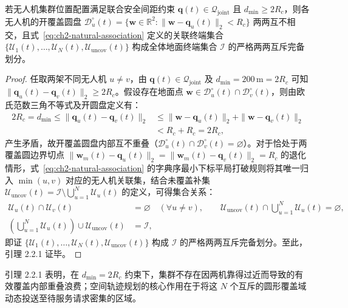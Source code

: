 \begin{lemma}[自然覆盖最近邻关联互斥性与完备划分]
若无人机集群位置配置满足联合安全间距约束 $\mathbf{q}(t)\in\mathcal{Q}_{\mathrm{joint}}$ 且 $d_{\min}\geq 2R_c$，则各无人机的开覆盖圆盘 $\mathcal{D}_u^\circ(t)=\{\mathbf{w}\in\mathbb{R}^2:\|\mathbf{w}-\mathbf{q}_u(t)\|_2<R_c\}$ 两两互不相交，且式~\eqref{eq:ch2-natural-association} 定义的关联终端集合 $\{\mathcal{U}_1(t),\allowbreak\ldots,\allowbreak\mathcal{U}_N(t),\allowbreak\mathcal{U}_{\mathrm{uncov}}(t)\}$ 构成全体地面终端集合 $\mathcal{I}$ 的严格两两互斥完备划分。
\end{lemma}

\begin{proof}
任取两架不同无人机 $u\neq v$，由 $\mathbf{q}(t)\in\mathcal{Q}_{\mathrm{joint}}$ 及 $d_{\min}=200\,\mathrm{m}=2R_c$ 可知 $\|\mathbf{q}_u(t)-\mathbf{q}_v(t)\|_2\geq 2R_c$。假设存在地面点 $\mathbf{w}\in\mathcal{D}_u^\circ(t)\cap\mathcal{D}_v^\circ(t)$，则由欧氏范数三角不等式及开圆盘定义有：
\begin{align*}
    2R_c=d_{\min}\leq\|\mathbf{q}_u(t)-\mathbf{q}_v(t)\|_2
    &\leq\|\mathbf{w}-\mathbf{q}_u(t)\|_2+\|\mathbf{w}-\mathbf{q}_v(t)\|_2 \\
    &<R_c+R_c=2R_c,
\end{align*}
产生矛盾，故开覆盖圆盘内部互不重叠（$\mathcal{D}_u^\circ(t)\cap\mathcal{D}_v^\circ(t)=\varnothing$）。对于恰处于两覆盖圆边界切点 $\|\mathbf{w}_m(t)-\mathbf{q}_u(t)\|_2=\|\mathbf{w}_m(t)-\mathbf{q}_v(t)\|_2=R_c$ 的退化情形，式~\eqref{eq:ch2-natural-association} 的字典序最小下标平局打破规则将其唯一归入 $\min(u,v)$ 对应的无人机关联集，结合未覆盖补集 $\mathcal{U}_{\mathrm{uncov}}(t)=\mathcal{I}\setminus\bigcup_{u=1}^N\mathcal{U}_u(t)$ 的定义，可得集合关系：
\begin{align*}
    \mathcal{U}_u(t)\cap\mathcal{U}_v(t)&=\varnothing\quad(\forall u\neq v),\qquad
    \mathcal{U}_{\mathrm{uncov}}(t)\cap\bigcup_{u=1}^{N}\mathcal{U}_u(t)=\varnothing, \\
    \left(\bigcup_{u=1}^{N}\mathcal{U}_u(t)\right)\cup\mathcal{U}_{\mathrm{uncov}}(t)&=\mathcal{I},
\end{align*}
即证 $\{\mathcal{U}_1(t),\allowbreak\ldots,\allowbreak\mathcal{U}_N(t),\allowbreak\mathcal{U}_{\mathrm{uncov}}(t)\}$ 构成 $\mathcal{I}$ 的严格两两互斥完备划分。至此，引理 2.2.1 证毕。
\end{proof}

引理 2.2.1 表明，在 $d_{\min}=2R_c$ 约束下，集群不存在因两机靠得过近而导致的有效覆盖内部重叠浪费；空间轨迹规划的核心作用在于将这 $N$ 个互斥的圆形覆盖域动态投送至待服务请求密集的区域。

